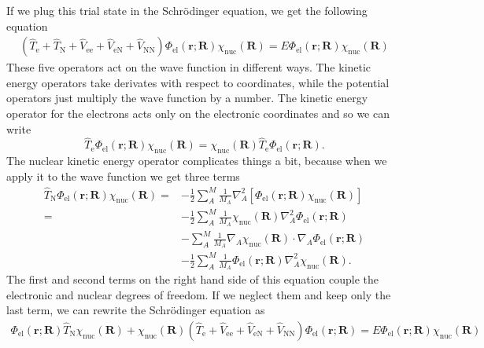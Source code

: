 \documentclass[../Main/chem532-notes.tex]{subfiles}
\begin{document}
If we plug this trial state in the Schr\"{o}dinger equation, we get the following equation
\begin{equation}
\label{eq:schrodinger_equation_factorized_ansatz}
\begin{split}
(\hat{T}_\mathrm{e} + \hat{T}_\mathrm{N} + \hat{V}_\mathrm{ee} + \hat{V}_\mathrm{eN} +\hat{V}_\mathrm{NN}) \Phi_{\mathrm{el}}(\mathbf{r};\mathbf{R}) \chi_{\mathrm{nuc}}(\mathbf{R})
= E \Phi_{\mathrm{el}}(\mathbf{r};\mathbf{R}) \chi_{\mathrm{nuc}}(\mathbf{R})
\end{split}
\end{equation}
These five operators act on the wave function in different ways.
The kinetic energy operators take derivates with respect to coordinates, while the potential operators just multiply the wave function by a number.
The kinetic energy operator for the electrons acts only on the electronic coordinates and so we can write
\begin{equation}
\hat{T}_\mathrm{e} \Phi_{\mathrm{el}}(\mathbf{r};\mathbf{R}) \chi_{\mathrm{nuc}}(\mathbf{R})
= \chi_{\mathrm{nuc}}(\mathbf{R}) \hat{T}_\mathrm{e} \Phi_{\mathrm{el}}(\mathbf{r};\mathbf{R}).
\end{equation}
The nuclear kinetic energy operator complicates things a bit, because when we apply it to the wave function we get three terms
\begin{equation}
\begin{split}
\hat{T}_\mathrm{N}  \Phi_{\mathrm{el}}(\mathbf{r};\mathbf{R}) \chi_{\mathrm{nuc}}(\mathbf{R})
 = &  -\frac{1}{2} \sum_A^M \frac{1}{M_A} \nabla^2_A \left[  \Phi_{\mathrm{el}}(\mathbf{r};\mathbf{R}) \chi_{\mathrm{nuc}}(\mathbf{R}) \right] \\
= &  -\frac{1}{2} \sum_A^M \frac{1}{M_A}
\chi_{\mathrm{nuc}}(\mathbf{R})  \nabla^2_A  
\Phi_{\mathrm{el}}(\mathbf{r};\mathbf{R}) \\
& 
 - \sum_A^M \frac{1}{M_A}
 \nabla_A\chi_{\mathrm{nuc}}(\mathbf{R})  \cdot \nabla_A  
\Phi_{\mathrm{el}}(\mathbf{r};\mathbf{R}) \\
& 
 -\frac{1}{2} \sum_A^M \frac{1}{M_A}
 \Phi_{\mathrm{el}}(\mathbf{r};\mathbf{R})  \nabla^2_A \chi_{\mathrm{nuc}}(\mathbf{R}).
\end{split}
\end{equation}
The first and second terms on the right hand side of this equation couple the electronic and nuclear degrees of freedom.
If we neglect them and keep only the last term, we can rewrite the Schr\"{o}dinger equation as
\begin{equation}
\begin{split}
\Phi_{\mathrm{el}}(\mathbf{r};\mathbf{R})   \hat{T}_\mathrm{N} \chi_{\mathrm{nuc}}(\mathbf{R}) + \chi_{\mathrm{nuc}}(\mathbf{R}) (\hat{T}_\mathrm{e} + \hat{V}_\mathrm{ee} + \hat{V}_\mathrm{eN} +\hat{V}_\mathrm{NN}) \Phi_{\mathrm{el}}(\mathbf{r};\mathbf{R}) 
= E \Phi_{\mathrm{el}}(\mathbf{r};\mathbf{R}) \chi_{\mathrm{nuc}}(\mathbf{R})
\end{split}
\end{equation}
\end{document}
